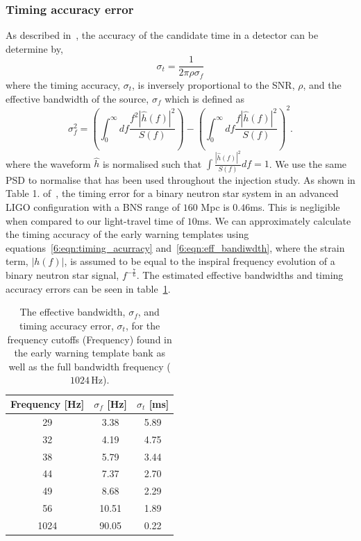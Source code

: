 \subsubsection{\label{6:sec:timing_error}Timing accuracy error}

As described in~\cite{Fairhurst:2010}, the accuracy of the candidate time in a detector can be determine by,
%
\begin{equation}
    \sigma_{t} = \frac{1}{2\pi\rho\sigma_{f}}
    \label{6:eqn:timing_acurracy}
\end{equation}
%
where the timing accuracy, $\sigma_{t}$, is inversely proportional to the SNR, $\rho$, and the effective bandwidth of the source, $\sigma_{f}$ which is defined as
%
\begin{equation}
    \sigma_{f}^2 = \left(\int^{\infty}_{0} df \frac{f^{2}|\hat{h}(f)|^{2}}{S(f)}\right) - \left( \int^{\infty}_{0} df \frac{f|\hat{h}(f)|^{2}}{S(f)}\right)^{2} .
    \label{6:eqn:eff_bandiwdth}
\end{equation}
%
where the waveform $\hat{h}$ is normalised such that $\int \frac{|\hat{h}(f)|^{2}}{S(f)}df = 1$. We use the same PSD to normalise that has been used throughout the injection study. As shown in Table 1. of~\cite{Fairhurst:2010}, the timing error for a binary neutron star system in an advanced LIGO configuration with a BNS range of $160$ Mpc is $0.46$ms. This is negligible when compared to our light-travel time of $10$ms. We can approximately calculate the timing accuracy of the early warning templates using equations~\ref{6:eqn:timing_acurracy} and~\ref{6:eqn:eff_bandiwdth}, where the \gwadj strain term, $|h(f)|$, is assumed to be equal to the inspiral frequency evolution of a binary neutron star signal, $f^{-\frac{7}{6}}$. The estimated effective bandwidths and timing accuracy errors can be seen in table~\ref{6:tab:timing_errors}.
%
\begin{table}[ht]
    \centering
    \setlength{\tabcolsep}{4pt}
    \begin{tabular}{ccc}
        \toprule
        \textbf{Frequency [Hz]} & $\sigma_{f}$ [Hz] & $\sigma_{t}$ [ms] \\
        \midrule
        29 & 3.38 & 5.89 \\
        32 & 4.19 & 4.75 \\
        38 & 5.79 & 3.44 \\
        44 & 7.37 & 2.70 \\
        49 & 8.68 & 2.29 \\
        56 & 10.51 & 1.89 \\
        1024 & 90.05 & 0.22 \\
        \bottomrule
    \end{tabular}
    \caption{The effective bandwidth, $\sigma_{f}$, and timing accuracy error, $\sigma_{t}$, for the frequency cutoffs (Frequency) found in the early warning template bank as well as the full bandwidth frequency ($1024 \, \text{Hz}$).}
    \label{6:tab:timing_errors}
\end{table}

